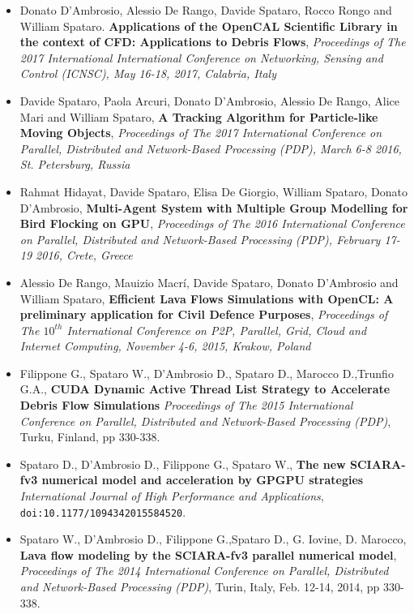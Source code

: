 \documentclass[a4paper,10pt]{article}
\begin{document}
\begin{itemize}

\item Donato D'Ambrosio, Alessio De Rango, Davide Spataro, Rocco Rongo and William Spataro. \textbf{Applications of the OpenCAL Scientific Library in the context of CFD: Applications to Debris Flows}, \emph{Proceedings of The 2017 International
  International Conference on Networking, Sensing and Control (ICNSC),
  May 16-18, 2017, Calabria, Italy} 

  \item Davide Spataro, Paola Arcuri, Donato D'Ambrosio, Alessio De Rango, Alice Mari and William Spataro, \textbf{A Tracking Algorithm for Particle-like Moving Objects}, \emph{Proceedings of The 2017 International
  Conference on Parallel, Distributed and Network-Based Processing (PDP),
  March 6-8 2016, St. Petersburg, Russia
  }
  \item Rahmat Hidayat, Davide Spataro, Elisa De Giorgio, William Spataro,
  Donato D'Ambrosio, \textbf{Multi-Agent System with Multiple Group Modelling
  for Bird Flocking on GPU}, \emph{Proceedings of The 2016 International
  Conference on Parallel, Distributed and Network-Based Processing (PDP),
  February 17-19 2016, Crete, Greece}

\item Alessio De Rango, Mauizio Macr\'i, Davide Spataro, Donato D'Ambrosio and
  William Spataro, \textbf{Efficient Lava Flows Simulations with OpenCL: A
  preliminary application for Civil Defence Purposes}, \emph{Proceedings of
  The $10^{th}$ International Conference on P2P, Parallel, Grid, Cloud and
  Internet Computing, November 4-6, 2015, Krakow, Poland}
  
	\item Filippone G., Spataro W., D'Ambrosio D., Spataro D., 
	Marocco D.,Trunfio G.A., \textbf{CUDA Dynamic Active Thread List Strategy 
	to Accelerate Debris Flow Simulations} \emph{Proceedings of The 2015 International Conference on Parallel, 
	Distributed and Network-Based Processing (PDP)}, Turku, Finland, pp 330-338.
	
	\item Spataro D., D'Ambrosio D., Filippone G., Spataro W., \textbf{The new
	SCIARA-fv3 numerical model and acceleration by GPGPU strategies}
	\emph{International Journal of High Performance and Applications},
	\texttt{doi:10.1177/1094342015584520}.
	
	\item Spataro W., D'Ambrosio D., Filippone G.,Spataro D., G.
    Iovine, D. Marocco, \textbf{Lava flow modeling by the SCIARA-fv3
    parallel numerical model}, \emph{Proceedings of The 2014 International
    Conference on Parallel, Distributed and Network-Based Processing (PDP)}, Turin, Italy, Feb. 12-14,
    2014, pp 330-338.
    

\end{itemize}
\end{document}
